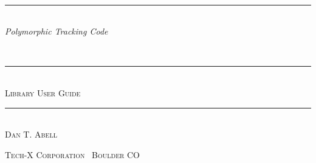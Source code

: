 
\cleardoublepage
\thispagestyle{empty}
{\raggedright
\fontsize{48}{60}\selectfont
\vspace*{0.20\textheight}\vspace*{-\baselineskip}
\hspace{0pt}\\[-0.85\baselineskip]
\rule{\textwidth}{\normalrulethickness}\\[9pt]
\Huge\itshape\hspace{0pt}
{\color{DarkRed}P}olymorphic
{\color{DarkRed}T}racking
{\color{DarkRed}C}ode
}


\clearpage
\thispagestyle{empty}


\cleardoublepage
\thispagestyle{empty}
{\centering
\fontsize{96}{108}\selectfont
\newlength{\PTCtitlelength}
  \addtolength{\PTCtitlelength}{10pt}
\vspace*{0.20\textheight}\vspace*{-\baselineskip}
\\[-0.92\baselineskip]
\rule{\PTCtitlelength}{4\normalrulethickness}\\
\Huge\textsc{Library User Guide}\\[-0.5\baselineskip]
\rule{\PTCtitlelength}{4\normalrulethickness}\\
{\huge\vspace*{5em}\textsc{Dan T. Abell}}\\
\vfill
\begin{center}
\large
\textsc{Tech-X Corporation {\normalfont\textperiodcentered}\ 
        Boulder CO {\normalfont\textperiodcentered}\ \PTCDocYear}\\
\end{center}
\vspace*{0.1\textheight}
}


\endinput
